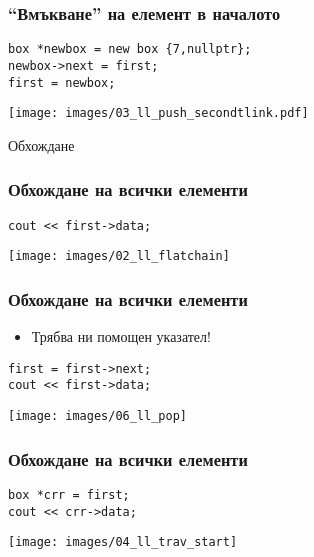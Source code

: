 \documentclass{beamer}
\begin{document}
\begin{frame}[fragile]
\frametitle{``Вмъкване'' на елемент в началото}

\begin{flushleft}
\begin{lstlisting}
box *newbox = new box {7,nullptr};
newbox->next = first;
first = newbox;
\end{lstlisting}  
\end{flushleft}


\texttt{[image: images/03\_ll\_push\_secondtlink.pdf]}

\end{frame}



\begin{frame}
\centerline{Обхождане}
\end{frame}



\begin{frame}[fragile]
\frametitle{Обхождане на всички елементи}

\begin{flushleft}
\begin{lstlisting}
cout << first->data;
\end{lstlisting}  
\end{flushleft}


\texttt{[image: images/02\_ll\_flatchain]}

\end{frame}

\begin{frame}[fragile]
\frametitle{Обхождане на всички елементи}

\begin{itemize}
  \item Трябва ни помощен указател!  
\end{itemize}

\begin{flushleft}
\begin{lstlisting}
first = first->next;
cout << first->data;
\end{lstlisting}  
\end{flushleft}


\texttt{[image: images/06\_ll\_pop]}

\end{frame}



\begin{frame}[fragile]
\frametitle{Обхождане на всички елементи}

\begin{flushleft}
\begin{lstlisting}
box *crr = first;
cout << crr->data;
\end{lstlisting}  
\end{flushleft}


\texttt{[image: images/04\_ll\_trav\_start]}

\end{frame}
\end{document}
